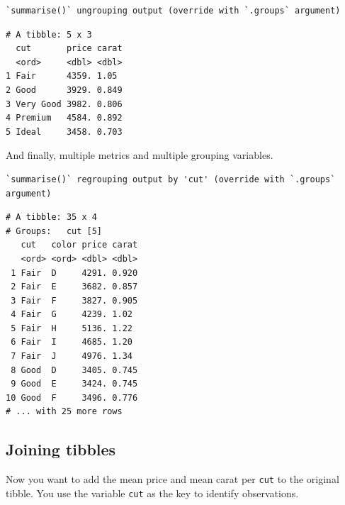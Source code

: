 \documentclass[
]{book}
\newenvironment{Shaded}{\begin{snugshade}}{\end{snugshade}}
\newcommand{\DataTypeTok}[1]{\textcolor[rgb]{0.13,0.29,0.53}{#1}}
\newcommand{\KeywordTok}[1]{\textcolor[rgb]{0.13,0.29,0.53}{\textbf{#1}}}
\newcommand{\NormalTok}[1]{#1}
\newcommand{\OperatorTok}[1]{\textcolor[rgb]{0.81,0.36,0.00}{\textbf{#1}}}
\newcommand{\StringTok}[1]{\textcolor[rgb]{0.31,0.60,0.02}{#1}}
\begin{document}
\begin{verbatim}
`summarise()` ungrouping output (override with `.groups` argument)
\end{verbatim}

\begin{verbatim}
# A tibble: 5 x 3
  cut       price carat
  <ord>     <dbl> <dbl>
1 Fair      4359. 1.05 
2 Good      3929. 0.849
3 Very Good 3982. 0.806
4 Premium   4584. 0.892
5 Ideal     3458. 0.703
\end{verbatim}

And finally, multiple metrics and multiple grouping variables.

\begin{Shaded}
\end{Shaded}

\begin{verbatim}
`summarise()` regrouping output by 'cut' (override with `.groups` argument)
\end{verbatim}

\begin{verbatim}
# A tibble: 35 x 4
# Groups:   cut [5]
   cut   color price carat
   <ord> <ord> <dbl> <dbl>
 1 Fair  D     4291. 0.920
 2 Fair  E     3682. 0.857
 3 Fair  F     3827. 0.905
 4 Fair  G     4239. 1.02 
 5 Fair  H     5136. 1.22 
 6 Fair  I     4685. 1.20 
 7 Fair  J     4976. 1.34 
 8 Good  D     3405. 0.745
 9 Good  E     3424. 0.745
10 Good  F     3496. 0.776
# ... with 25 more rows
\end{verbatim}

\hypertarget{joining-tibbles}{%
\subsection{Joining tibbles}\label{joining-tibbles}}

Now you want to add the mean price and mean carat per \texttt{cut} to the original tibble. You use the variable \texttt{cut} as the key to identify observations.

\begin{Shaded}
\end{Shaded}
\end{document}
